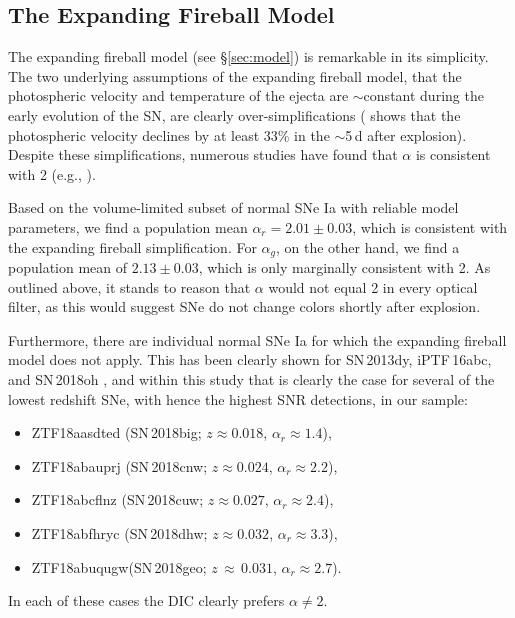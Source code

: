 \documentclass[twocolumn]{./aastex63}
\begin{document}
\subsection{The Expanding Fireball Model}\label{sec:fireball_discussion}

The expanding fireball model (see \S\ref{sec:model}) is remarkable in its
simplicity. The two underlying assumptions of the expanding fireball model,
that the photospheric velocity and temperature of the ejecta are
$\sim$constant during the early evolution of the SN, are clearly
over-simplifications (\citealt{Parrent12} shows that the photospheric velocity
declines by at least 33\% in the $\sim$5\,d after explosion). Despite these
simplifications, numerous studies have found that $\alpha$ is consistent with
2 (e.g.,
\citealt{Conley06,Hayden10,Ganeshalingam11,Gonzalez-Gaitan12,Zheng17a}).

Based on the volume-limited subset of normal SNe Ia with reliable model
parameters, we find a population mean $\alpha_r = 2.01 \pm 0.03$, which is
consistent with the expanding fireball simplification. For $\alpha_g$, on the
other hand, we find a population mean of $2.13 \pm 0.03$, which is only
marginally consistent with 2. As outlined above, it stands to reason that
$\alpha$ would not equal 2 in every optical filter, as this would suggest SNe
do not change colors shortly after explosion.

Furthermore, there are individual normal SNe Ia for which the expanding
fireball model does not apply. This has been clearly shown for SN\,2013dy,
iPTF\,16abc, and SN\,2018oh \citep{Zheng13,Miller18,Shappee19,Dimitriadis19},
and within this study that is clearly the case for several of the lowest
redshift SNe, with hence the highest SNR detections, in our sample:
% 
\begin{itemize}
\item ZTF18aasdted (SN\,2018big; $z \approx 0.018$, $\alpha_r \approx 1.4$),
\item ZTF18abauprj (SN\,2018cnw; $z \approx 0.024$, $\alpha_r \approx 2.2$),
\item ZTF18abcflnz (SN\,2018cuw; $z \approx 0.027$, $\alpha_r \approx 2.4$),
\item ZTF18abfhryc (SN\,2018dhw; $z \approx 0.032$, $\alpha_r \approx 3.3$), 
\item ZTF18abuqugw\;(SN\,2018geo; $z\,\approx\,0.031$, $\alpha_r\approx2.7$).
\end{itemize}
% 
 In each of these cases the DIC clearly prefers $\alpha \neq 2$.
\end{document}
